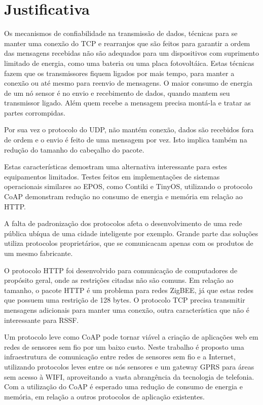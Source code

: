 \section{Justificativa}

Os mecanismos de confiabilidade na transmiss\~ao de dados, t\'ecnicas para se manter uma conex\~ao do TCP e rearranjos que s\~ao feitos para garantir a ordem das mensagens recebidas n\~ao s\~ao adequados para um dispositivos com suprimento limitado de energia, como uma bateria ou uma placa fotovolt\'aica. Estas t\'ecnicas fazem que os transmissores fiquem ligados por mais tempo, para manter a conex\~ao ou at\'e mesmo para reenvio de mensagens. O maior consumo de energia de um n\'o sensor \'e no envio e recebimento de dados, quando mantem seu transmissor ligado. Al\'em quem recebe a mensagem precisa mont\'a-la e tratar as partes corrompidas.

Por sua vez o protocolo do UDP, n\~ao mant\'em conex\~ao, dados s\~ao recebidos fora de ordem e o envio \'e feito de uma mensagem por vez. Isto implica tamb\'em na redu\c{c}\~ao do tamanho do cabe\c{c}alho do pacote.

Estas caracter\'isticas demostram uma alternativa interessante para estes equipamentos limitados. Testes feitos em implementa\c{c}\~oes de sistemas operacionais similares ao EPOS, como Contiki e TinyOS, utilizando o protocolo CoAP demonstram redu\c{c}\~ao no consumo de energia e mem\'oria em rela\c{c}\~ao ao HTTP.\cite{transportApp}

A falta de padroniza\c{c}\~ao dos protocolos afeta o desenvolvimento de uma rede p\'ublica ub\'iqua de uma cidade inteligente por exemplo. Grande parte das solu\c{c}\~oes utiliza protocolos propriet\'arios, que se comunicacam apenas com os produtos de um mesmo fabricante.

O protocolo HTTP foi desenvolvido para comunica\c{c}\~ao de computadores de prop\'osito geral, onde as restri\c{c}\~oes citadas n\~ao s\~ao comuns. Em rela\c{c}\~ao ao tamanho, o pacote HTTP \'e um problema para redes ZigBEE, j\'a que estas redes que possuem uma restri\c{c}\~ao de 128 bytes. O protocolo TCP precisa transmitir mensagens adicionais para manter uma conex\~ao, outra caracter\'istica que n\~ao \'e interessante para RSSF.

Um protocolo leve como CoAP pode tornar vi\'avel a cria\c{c}\~ao de aplica\-\c{c}\~oes web em redes de sensores sem fio por um baixo custo. Neste trabalho \'e proposto uma infraestrutura de comunica\c{c}\~ao entre redes de sensores sem fio e a Internet, utilizando protocolos leves entre os n\'os sensores e um gateway GPRS para \'areas sem acesso \`a WIFI, aproveitando a vasta abrang\^encia da tecnologia de telefonia. Com a utiliza\c{c}\~ao do CoAP \'e esperado uma redu\c{c}\~ao de consumo de energia e mem\'oria, em rela\c{c}\~ao a outros protocolos de aplica\c{c}\~ao existentes.


